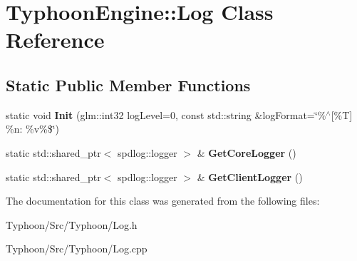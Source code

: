 \hypertarget{class_typhoon_engine_1_1_log}{}\section{Typhoon\+Engine\+::Log Class Reference}
\label{class_typhoon_engine_1_1_log}
\subsection*{Static Public Member Functions}
\begin{DoxyCompactItemize}
\item 
\mbox{\label{class_typhoon_engine_1_1_log_af4c2741f61deb30d966788f635055de4}} 
static void {\bfseries Init} (glm\+::int32 log\+Level=0, const std\+::string \&log\+Format=\char`\"{}\%$^\wedge$\mbox{[}\%T\mbox{]} \%n\+: \%v\%\$\char`\"{})
\item 
\mbox{\label{class_typhoon_engine_1_1_log_a736da8b132b70478bdb533689ae95cb8}} 
static std\+::shared\+\_\+ptr$<$ spdlog\+::logger $>$ \& {\bfseries Get\+Core\+Logger} ()
\item 
\mbox{\label{class_typhoon_engine_1_1_log_a800401d727c124e21c4dbbf0af1b28c2}} 
static std\+::shared\+\_\+ptr$<$ spdlog\+::logger $>$ \& {\bfseries Get\+Client\+Logger} ()
\end{DoxyCompactItemize}


The documentation for this class was generated from the following files\+:\begin{DoxyCompactItemize}
\item 
Typhoon/\+Src/\+Typhoon/Log.\+h\item 
Typhoon/\+Src/\+Typhoon/Log.\+cpp\end{DoxyCompactItemize}
